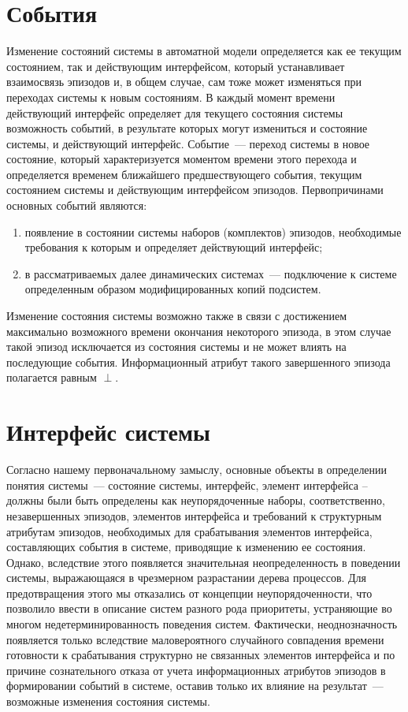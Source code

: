 \section{События}

Изменение состояний системы в автоматной модели определяется как ее текущим состоянием, так и действующим интерфейсом, который устанавливает взаимосвязь эпизодов и, в общем случае, сам тоже может изменяться при переходах системы к новым состояниям. В каждый момент времени действующий интерфейс определяет для текущего состояния системы возможность событий, в результате которых могут измениться и состояние системы, и действующий интерфейс. 
Событие~--- переход системы в новое состояние, который характеризуется моментом времени этого перехода и определяется временем ближайшего предшествующего события, текущим состоянием системы и действующим интерфейсом эпизодов. 
Первопричинами основных событий являются: 
\begin{enumerate}[label=1)]
	\item появление в состоянии системы наборов (комплектов) эпизодов, необходимые требования к которым и определяет действующий интерфейс;
	\item в рассматриваемых далее динамических системах~--- подключение к системе определенным образом модифицированных копий подсистем. 
\end{enumerate}
Изменение состояния системы возможно также в связи с достижением максимально возможного времени окончания некоторого эпизода, в этом случае такой эпизод исключается из состояния системы и не может влиять на последующие события. 
Информационный атрибут такого завершенного эпизода полагается равным $ \perp $.

\section{Интерфейс системы}
Согласно нашему первоначальному замыслу, основные объекты в определении понятия системы~--- состояние системы, интерфейс, элемент интерфейса – должны были быть определены как неупорядоченные наборы, соответственно, незавершенных эпизодов, элементов интерфейса и требований к структурным атрибутам эпизодов, необходимых для срабатывания элементов интерфейса, составляющих события в системе, приводящие к изменению ее состояния. 
Однако, вследствие этого появляется значительная неопределенность в поведении системы, выражающаяся в чрезмерном разрастании дерева процессов. Для предотвращения этого мы отказались от концепции неупорядоченности, что позволило ввести в описание систем разного рода приоритеты, устраняющие во многом недетерминированность поведения систем. 
Фактически, неоднозначность появляется только вследствие маловероятного случайного совпадения времени готовности к срабатывания структурно не связанных элементов интерфейса и по причине сознательного отказа от учета информационных атрибутов эпизодов в формировании событий в системе, оставив только их влияние на результат~--- возможные изменения состояния системы.

